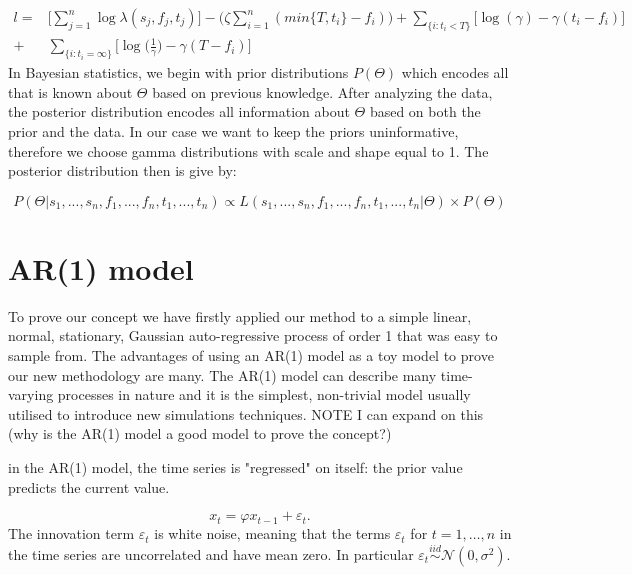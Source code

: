 \documentclass[11pt,a4paper]{article}
\newcommand{\eps}{\varepsilon}
\begin{document}
\[
\begin{aligned}
l = & \Bigg[ \sum_{j=1}^{n} \log \lambda(s_{j},f_{j}, t_{j}) \Bigg] - \bigg(\zeta \sum_{i=1}^{n} (min\{ T, t_i \} - f_i) \bigg)  + \sum_{\{ i : t_{i} < T \} }  \bigg[\log (\gamma) -\gamma(t_{i} - f_{i}) \bigg] \\
+ & \sum_{ \{ i : t_{i} = \infty \} } \bigg[\log \bigg(\frac{1}{\gamma}\bigg) -\gamma(T - f_{i}) \bigg]
\end{aligned}
\]
In Bayesian statistics, we begin with prior distributions $P(\Theta)$ which encodes all that is known about $\Theta$ based on previous knowledge. After analyzing the data, the posterior distribution encodes all information about $\Theta$ based on both the prior and the data. In our case we want to keep the priors uninformative, therefore we choose gamma distributions with scale and shape equal to 1. The posterior distribution then is give by:

\[
P(\Theta | s_{1}, ..., s_{n}, f_{1}, ... , f_{n}, t_{1}, ..., t_{n}) \propto L(s_{1}, ..., s_{n}, f_{1}, ... , f_{n}, t_{1}, ..., t_{n} | \Theta) \times P(\Theta)
\]






\section{AR(1) model}

To prove our concept we have firstly applied our method to a simple linear, normal, stationary, Gaussian auto-regressive process of order 1 that was easy to sample from. The advantages of using an AR(1) model as a toy model to prove our new methodology are many. The AR(1) model can describe many time-varying processes in nature and it is the simplest, non-trivial model usually utilised to introduce new simulations techniques. {\color{red} NOTE I can expand on this (why is the AR(1) model a good model to prove the concept?)}

in the AR(1) model, the time series is "regressed" on itself: the prior value predicts the current value.

\begin{equation} \label{eq:1}
x_{t} = \varphi x_{t-1} + \eps_{t}.
\end{equation}
The innovation term $\eps_t$ is white noise, meaning that the terms $\eps_t$ for $t = 1 , \dots, n$ in the time series are uncorrelated and have mean zero. In particular $\eps_{t} \stackrel{iid}{\sim} \mathcal{N}(0, \sigma^{2})$.
\end{document}
